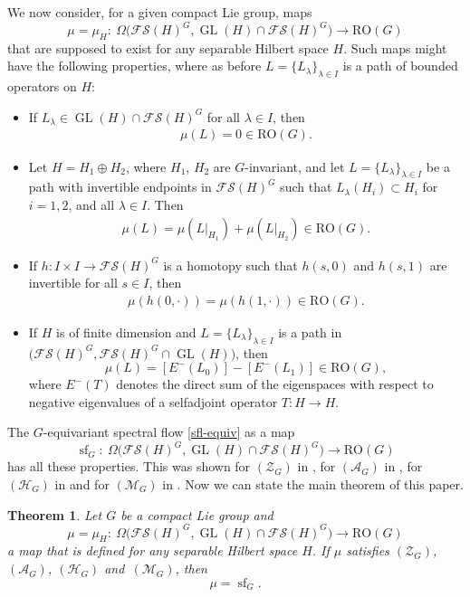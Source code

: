 \documentclass[pdftex]{sigma}
\numberwithin{equation}{section}
\newtheorem{Theorem}{Theorem}[section]
\theoremstyle{definition}
\DeclareMathOperator{\sfl}{sf}
\DeclareMathOperator{\GL}{GL}
\begin{document}
We now consider, for a given compact Lie group, maps
\[\mu=\mu_{H}\colon \ \Omega\bigl(\mathcal{FS}(H)^G,\GL(H)\cap\mathcal{FS}(H)^G\bigr)\rightarrow \mathrm{RO}(G)\]
that are supposed to exist for any separable Hilbert space $H$. Such maps might have the following properties, where as before $L=\{L_\lambda\}_{\lambda\in I}$ is a path of bounded operators on $H$:
\begin{itemize}[leftmargin=30pt]\itemsep=0pt
 \item[$(\mathcal{Z}_G)$] If $L_\lambda\in\GL(H)\cap\mathcal{FS}(H)^G$ for all $\lambda\in I$, then
 \begin{align*}
 \mu(L)=0\in \mathrm{RO}(G).
 \end{align*}
 \item[$(\mathcal{A}_G)$] Let $H=H_1\oplus H_2$, where $H_1$, $H_2$ are $G$-invariant, and let $L=\{L_\lambda\}_{\lambda\in I}$ be a path with invertible endpoints in $\mathcal{FS}(H)^G$ such that $L_\lambda(H_i)\subset H_i$ for $i=1,2$, and all $\lambda\in I$. Then
\begin{align*}
\mu(L)=\mu(L|_{H_1})+\mu(L|_{H_2})\in \mathrm{RO}(G).
\end{align*}
\item[$(\mathcal{H}_G)$] If $h \colon I\times I\rightarrow\mathcal{FS}(H)^G$ is a homotopy such that $h(s,0)$ and $h(s,1)$ are invertible for all $s\in I$, then
\begin{align*}
\mu(h(0,\cdot))=\mu(h(1,\cdot))\in \mathrm{RO}(G).
\end{align*}
\item[$(\mathcal{M}_G)$] If $H$ is of finite dimension and $L=\{L_\lambda\}_{\lambda\in I}$ is a path in $\bigl(\mathcal{FS}(H)^G,\mathcal{FS}(H)^G\cap\GL(H)\bigr)$, then
\[\mu(L)=[E^-(L_0)]-[E^-(L_1)]\in \mathrm{RO}(G),\]
where $E^-(T)$ denotes the direct sum of the eigenspaces with respect to negative eigenvalues of a selfadjoint operator $T \colon H\rightarrow H$.
\end{itemize}
The $G$-equivariant spectral flow \eqref{sfl-equiv} as a map
\[\sfl_G \colon \ \Omega\bigl(\mathcal{FS}(H)^G,\GL(H)\cap\mathcal{FS}(H)^G\bigr)\rightarrow \mathrm{RO}(G)\]
has all these properties. This was shown for $(\mathcal{Z}_G)$ in \cite[Lemma~2.5]{MJN21}, for $(\mathcal{A}_G)$ in \cite[Lemma~2.6]{MJN21}, for $(\mathcal{H}_G)$ in \cite[Corollary~2.10]{MJN21} and for $(\mathcal{M}_G)$ in \cite[Proposition~3.2]{MJN21}. Now we can state the main theorem of this paper.

\begin{Theorem}\label{thm-uniqueness}
Let $G$ be a compact Lie group and
\[\mu=\mu_{H} \colon \ \Omega\bigl(\mathcal{FS}(H)^G,\GL(H)\cap\mathcal{FS}(H)^G\bigr)\rightarrow \mathrm{RO}(G)\]
a map that is defined for any separable Hilbert space $H$. If $\mu$ satisfies $(\mathcal{Z}_G)$, $(\mathcal{A}_G)$, $(\mathcal{H}_G)$ and~$(\mathcal{M}_G)$, then
\[\mu=\sfl_G.\]
\end{Theorem}
\end{document}
